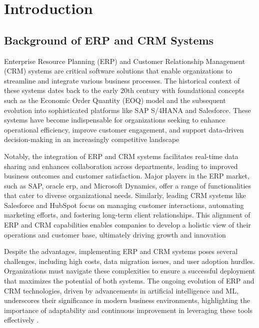 



\chapter{Introduction}
\section{Background of ERP and CRM Systems} 

Enterprise Resource Planning (ERP) and Customer Relationship Management (CRM) systems are critical software solutions that enable organizations to streamline and integrate various business processes. The historical context of these systems dates back to the early 20th century with foundational concepts such as the Economic Order Quantity (EOQ) model and the subsequent evolution into sophisticated platforms like SAP S/4HANA and Salesforce. These systems have become indispensable for organizations seeking to enhance operational efficiency, improve customer engagement, and support data-driven decision-making in an increasingly competitive landscape \cite{oracle_erp,software_suggest_erp,softwareconnect} %

Notably, the integration of ERP and CRM systems facilitates real-time data sharing and enhances collaboration across departments, leading to improved business outcomes and customer satisfaction. Major players in the ERP market, such as SAP, oracle erp, and Microsoft Dynamics, offer a range of functionalities that cater to diverse organizational needs. Similarly, leading CRM systems like Salesforce and HubSpot focus on managing customer interactions, automating marketing efforts, and fostering long-term client relationships. This alignment of ERP and CRM capabilities enables companies to develop a holistic view of their operations and customer base, ultimately driving growth and innovation \cite{forbes_crm} %

Despite the advantages, implementing ERP and CRM systems poses several challenges, including high costs, data migration issues, and user adoption hurdles. Organizations must navigate these complexities to ensure a successful deployment that maximizes the potential of both systems. The ongoing evolution of ERP and CRM technologies, driven by advancements in artificial intelligence and ML, underscores their significance in modern business environments, highlighting the importance of adaptability and continuous improvement in leveraging these tools effectively \cite{sap_features,oracle_erp,sap_s4hana}.


